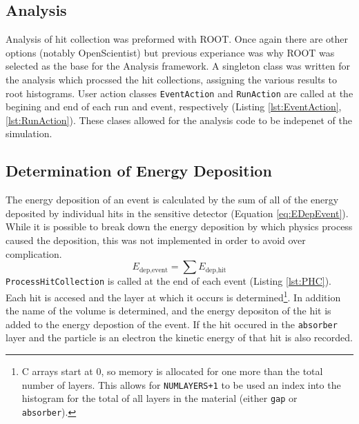\subsection{Analysis}

Analysis of hit collection was preformed with ROOT.  Once again there are other options (notably OpenScientist) but previous experiance was why ROOT was selected as the base for the Analysis framework.
A singleton class was written for the analysis which procssed the hit collections, assigning the various results to root histograms.
User action classes \verb+EventAction+ and \verb+RunAction+ are called at the begining and end of each run and event, respectively (Listing \ref{lst:EventAction},\ref{lst:RunAction}).
These clases allowed for the analysis code to be indepenet of the simulation.



\subsection{Determination of Energy Deposition}

The energy deposition of an event is calculated by the sum of all of the energy deposited by individual hits in the sensitive detector (Equation \ref{eq:EDepEvent}).
While it is possible to break down the energy deposition by which physics process caused the deposition, this was not implemented in order to avoid over complication.
\begin{equation}[h]
\label{eq:EDepEvent}
E_{\text{dep},\text{event}} = \sum{E_{\text{dep},\text{hit}} }
\end{equation}
\verb+ProcessHitCollection+ is called at the end of each event (Listing \ref{lst:PHC}).
Each hit is accesed and the layer at which it occurs is determined\footnote{C arrays start at 0, so memory is allocated for one more than the total number of layers. This allows for \verb|NUMLAYERS+1| to be used an index into the histogram for the total of all layers in the material (either \verb+gap+ or \verb+absorber+). }.
In addition the name of the volume is determined, and the energy depositon of the hit is added to the energy depostion of the event.
If the hit occured in the \verb+absorber+ layer and the particle is an electron the kinetic energy of that hit is also recorded.


